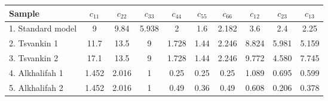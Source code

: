 {
\centering
     	     \begin{tabular}{|l|c|c|c|c|c|c|c|c|c|}
     	     \hline Sample & $ c_{11}$ & $ c_{22}$ & $ c_{33}$ & $ c_{44} $ & $ c_{55}$ & $ c_{66}$ & $ c_{12}$ & $ c_{23}$ & $ c_{13}$\\ 
     	     \hline 1. Standard model & 9 & 9.84 & 5.938 & 2 & 1.6 & 2.182 & 3.6 & 2.4 & 2.25 \\
     	     \hline 2. Tsvankin 1 & 11.7 & 13.5 & 9 & 1.728 & 1.44 & 2.246 & 8.824 & 5.981 & 5.159 \\
     	     \hline 3. Tsvankin 2 & 17.1 & 13.5 & 9 & 1.728 & 1.44 & 2.246 & 9.772 & 4.580 & 7.745 \\
     	     \hline 4. Alkhalifah 1 & 1.452 & 2.016 & 1 & 0.25 & 0.25 & 0.25 & 1.089 & 0.695 & 0.599 \\
     	     \hline 5. Alkhalifah 2 & 1.452 & 2.016 & 1 & 0.49 & 0.36 & 0.49 & 0.608 & 0.206 & 0.378 \\
      \hline
    \end{tabular}
}


